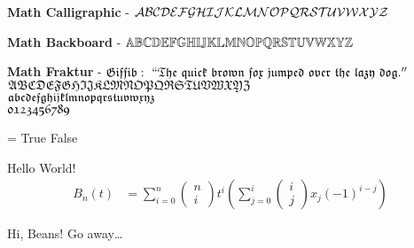\textbf{Math Calligraphic} - $\mathcal{ABCDEFGHIJKLMNOPQRSTUVWXYZ}$

\textbf{Math Backboard} - $\mathbb{ABCDEFGHIJKLMNOPQRSTUVWXYZ}$

\textbf{Math Fraktur} - $\mathfrak{Giffib:\ ``The\ quick\ brown\ fox\ jumped\ over\ the\ lazy\ dog.''}$\\$\mathfrak{ABCDEFGHIJKLMNOPQRSTUVWXYZ}$\\%
$\mathfrak{abcdefghijklmnopqrstuvwxyz}$\\$\mathfrak{0123456789}$


\newpage


\lipsum[1]

\setcounter{gamma}{1}
\ifnum\value{alpha}=\value{gamma}
    True
\else
    False
\fi

Hello World!
\begin{align*}
    B_n(t) &= \sum_{i=0}^{n} \begin{pmatrix} n \\ i \end{pmatrix} t^i
        \left(\sum_{j=0}^{i} \begin{pmatrix} i \\ j \end{pmatrix} x_j(-1)^{i-j}\right)
\end{align*}


\newpagerecto
Hi, Beans!
\newpageverso
Go away\dots

